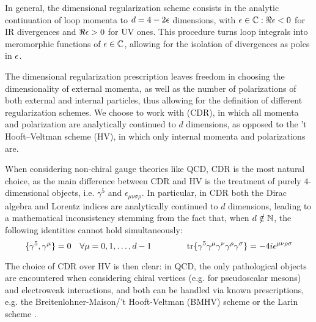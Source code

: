 In general, the dimensional regularization scheme consists in the analytic continuation of loop momenta to $ d = 4 - 2 \epsilon $ dimensions, with $ \epsilon \in \mathbb{C} : \Re\epsilon < 0 $ for IR divergences and $ \Re\epsilon > 0 $ for UV ones. This procedure turns loop integrals into meromorphic functions of $ \epsilon \in \mathbb{C} $, allowing for the isolation of divergences as poles in $ \epsilon $.

The dimensional regularization prescription leaves freedom in choosing the dimensionality of external momenta, as well as the number of polarizations of both external and internal particles, thus allowing for the definition of different regularization schemes. We choose to work with  (CDR), in which all momenta and polarization are analytically continued to $ d $ dimensions, as opposed to the 't Hooft--Veltman scheme (HV), in which only internal momenta and polarizations are.

When considering non-chiral gauge theories like QCD, CDR is the most natural choice, as the main difference between CDR and HV is the treatment of purely $ 4 $-dimensional objects, i.e. $ \gamma^5 $ and $ \epsilon_{\mu \nu \sigma \rho} $. In particular, in CDR both the Dirac algebra and Lorentz indices are analytically continued to $ d $ dimensions, leading to a mathematical inconsistency stemming from the fact that, when $ d \notin \mathbb{N} $, the following identities cannot hold simultaneously\footnotemark:
\begin{equation*}
  \{\gamma^5 , \gamma^\mu\} = 0 \quad \forall \mu = 0, 1, \dots, d-1
  \qquad \qquad
  \operatorname{tr}\{\gamma^5 \gamma^\mu \gamma^\nu \gamma^\rho \gamma^\sigma\} = -4 i \epsilon^{\mu \nu \rho \sigma}
\end{equation*}


The choice of CDR over HV is then clear: in QCD, the only pathological objects are encountered when considering chiral vertices (e.g. for pseudoscalar mesons) and electroweak interactions, and both can be handled via known prescriptions, e.g. the Breitenlohner-Maison/'t Hooft-Veltman (BMHV) scheme \cite{Breitenlohner-1977} or the Larin scheme \cite{Larin-1993}.

